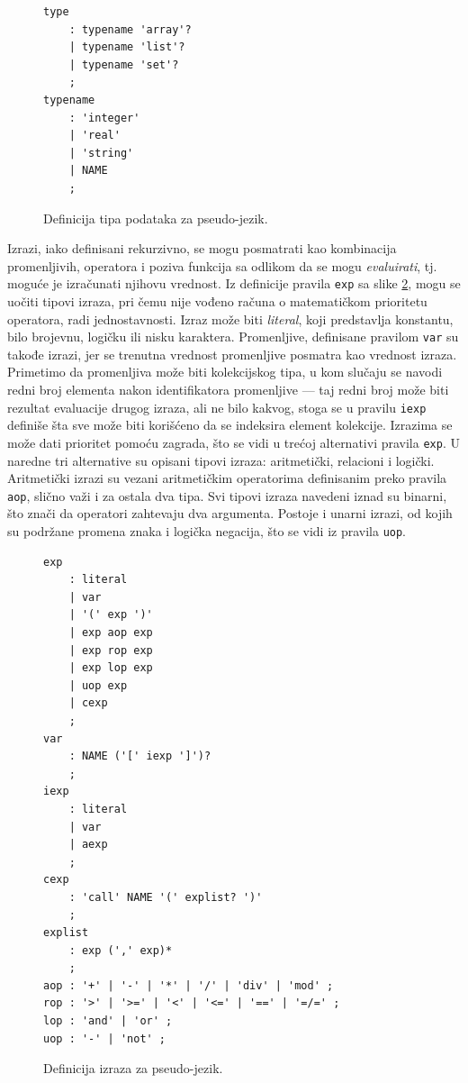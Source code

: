 \begin{figure}[h!]
\begin{lstlisting}[language={}]
type 
    : typename 'array'?
    | typename 'list'?
    | typename 'set'?
    ;
typename 
    : 'integer' 
    | 'real' 
    | 'string' 
    | NAME 
    ;
\end{lstlisting}
\caption{Definicija tipa podataka za pseudo-jezik.}
\label{fig:PseudoDef5}
\end{figure}

Izrazi, iako definisani rekurzivno, se mogu posmatrati kao kombinacija promenljivih, operatora i poziva funkcija sa odlikom da se mogu \emph{evaluirati}, tj. moguće je izračunati njihovu vrednost. Iz definicije pravila \texttt{exp} sa slike \ref{fig:PseudoDef6}, mogu se uočiti tipovi izraza, pri čemu nije vođeno računa o matematičkom prioritetu operatora, radi jednostavnosti. Izraz može biti \emph{literal}, koji predstavlja konstantu, bilo brojevnu, logičku ili nisku karaktera. Promenljive, definisane pravilom \texttt{var} su takođe izrazi, jer se trenutna vrednost promenljive posmatra kao vrednost izraza. Primetimo da promenljiva može biti kolekcijskog tipa, u kom slučaju se navodi redni broj elementa nakon identifikatora promenljive --- taj redni broj može biti rezultat evaluacije drugog izraza, ali ne bilo kakvog, stoga se u pravilu \texttt{iexp} definiše šta sve može biti korišćeno da se indeksira element kolekcije. Izrazima se može dati prioritet pomoću zagrada, što se vidi u trećoj alternativi pravila \texttt{exp}. U naredne tri alternative su opisani tipovi izraza: aritmetički, relacioni i logički. Aritmetički izrazi su vezani aritmetičkim operatorima definisanim preko pravila \texttt{aop}, slično važi i za ostala dva tipa. Svi tipovi izraza navedeni iznad su binarni, što znači da operatori zahtevaju dva argumenta. Postoje i unarni izrazi, od kojih su podržane promena znaka i logička negacija, što se vidi iz pravila \texttt{uop}.

\begin{figure}[h!]
\begin{lstlisting}[language={}]
exp
    : literal 
    | var
    | '(' exp ')'
    | exp aop exp
    | exp rop exp
    | exp lop exp
    | uop exp
    | cexp
    ;
var 
    : NAME ('[' iexp ']')?
    ;
iexp 
    : literal
    | var
    | aexp
    ;
cexp
    : 'call' NAME '(' explist? ')'
    ;
explist
    : exp (',' exp)*
    ;
aop : '+' | '-' | '*' | '/' | 'div' | 'mod' ;
rop : '>' | '>=' | '<' | '<=' | '==' | '=/=' ;
lop : 'and' | 'or' ;
uop : '-' | 'not' ;
\end{lstlisting}
\caption{Definicija izraza za pseudo-jezik.}
\label{fig:PseudoDef6}
\end{figure}

